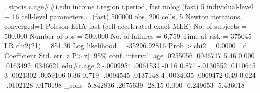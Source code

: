 . stpois c.age\#\#i.edu income i.region i.period, fast nolog
  (fast) 5 individual-level + 16 cell-level parameters...
  (fast) 500000 obs, 200 cells, 5 Newton iterations, converged=1
{\smallskip}
Poisson EHA {\EMDASH} fast (cell-accelerated exact MLE)
{\smallskip}
No. of subjects =      500,000                  Number of obs   =  500,000
No. of failures =        6,759
Time at risk    =       375045                  LR chi2(21)     =   851.30
Log likelihood  = -35296.92816                  Prob > chi2     =   0.0000
{\smallskip}
          _d {\VBAR} Coefficient  Std. err.      z    P>|z|     [95\% conf. interval]
         age {\VBAR}   .0255056   .0046717     5.46   0.000     .0163492    .0346621
             {\VBAR}
   edu\#c.age {\VBAR}
          2  {\VBAR}  -.0009954   .0061531    -0.16   0.871    -.0130552    .0110645
          3  {\VBAR}   .0021302   .0059106     0.36   0.719    -.0094545    .0137148
          4  {\VBAR}   .0034035   .0069472     0.49   0.624    -.0102128    .0170198
             {\VBAR}
\oom
       _cons {\VBAR}  -5.842836   .2075639   -28.15   0.000    -6.249653   -5.436018

